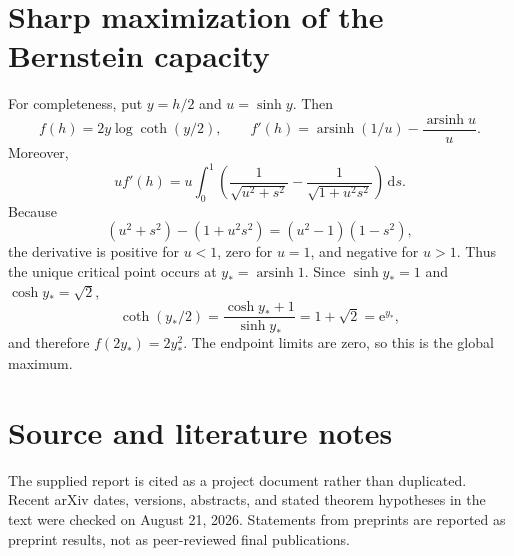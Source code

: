 \documentclass[11pt,oneside]{article}
\theoremstyle{definition}
\theoremstyle{remark}
\newcommand{\asinh}{\operatorname{arsinh}}
\newcommand{\e}{\mathrm e}
\newcommand{\dd}{\,\mathrm d}
\begin{document}
\section{Sharp maximization of the Bernstein capacity}
\label{app:capacity}

For completeness, put $y=h/2$ and $u=\sinh y$.  Then
\[
 f(h)=2y\log\coth(y/2),
 \qquad
 f'(h)=\asinh(1/u)-\frac{\asinh u}{u}.
\]
Moreover,
\[
 u f'(h)=u\int_0^1\left(
 \frac1{\sqrt{u^2+s^2}}-\frac1{\sqrt{1+u^2s^2}}
 \right)\dd s.
\]
Because
\[
 (u^2+s^2)-(1+u^2s^2)=(u^2-1)(1-s^2),
\]
the derivative is positive for $u<1$, zero for $u=1$, and negative for $u>1$.  Thus the unique critical point occurs at $y_*=\asinh1$.  Since $\sinh y_*=1$ and $\cosh y_*=\sqrt2$,
\[
 \coth(y_*/2)=\frac{\cosh y_*+1}{\sinh y_*}=1+\sqrt2=\e^{y_*},
\]
and therefore $f(2y_*)=2y_*^2$.  The endpoint limits are zero, so this is the global maximum.

\section{Source and literature notes}
\label{app:sources}

The supplied report is cited as a project document rather than duplicated.  Recent arXiv dates, versions, abstracts, and stated theorem hypotheses in the text were checked on August 21, 2026.  Statements from preprints are reported as preprint results, not as peer-reviewed final publications.
\end{document}
